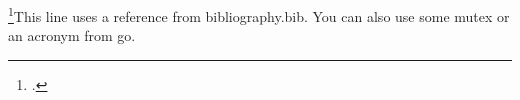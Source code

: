 \footcite{book:maintainable-software}This line uses a reference from bibliography.bib. You can also use some \gls{mutex} or an acronym from \acrfull{go}.